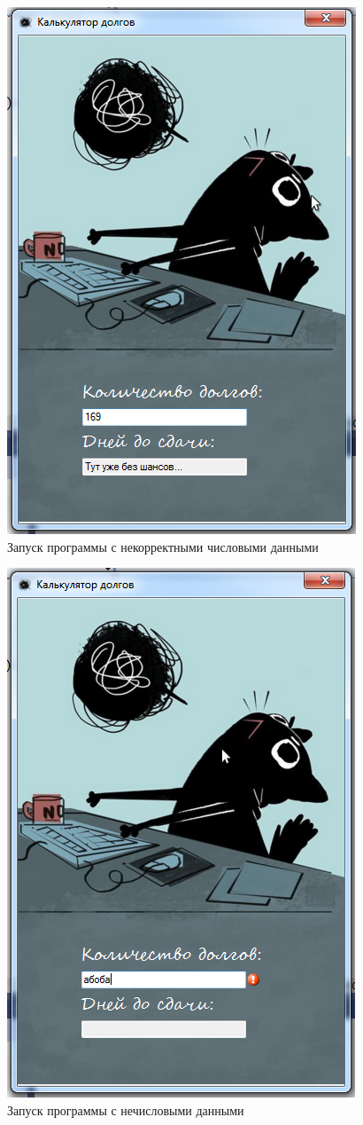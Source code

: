 \begin{figure}
  \centering
  \includegraphics[width=0.5\linewidth]{images/factorial/error.png}
  \caption{Запуск программы с некорректными числовыми данными}
  \label{fig:factorial-error}
\end{figure}

\begin{figure}
  \centering
  \includegraphics[width=0.5\linewidth]{images/factorial/error2.png}
  \caption{Запуск программы с нечисловыми данными}
  \label{fig:factorial-error2}
\end{figure}

